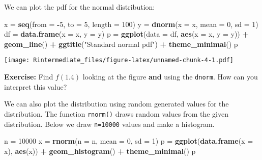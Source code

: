 \documentclass[]{article}
\newenvironment{Shaded}{\begin{snugshade}}{\end{snugshade}}
\newcommand{\KeywordTok}[1]{\textcolor[rgb]{0.13,0.29,0.53}{\textbf{#1}}}
\newcommand{\DataTypeTok}[1]{\textcolor[rgb]{0.13,0.29,0.53}{#1}}
\newcommand{\DecValTok}[1]{\textcolor[rgb]{0.00,0.00,0.81}{#1}}
\newcommand{\StringTok}[1]{\textcolor[rgb]{0.31,0.60,0.02}{#1}}
\newcommand{\OperatorTok}[1]{\textcolor[rgb]{0.81,0.36,0.00}{\textbf{#1}}}
\newcommand{\NormalTok}[1]{#1}
\begin{document}
We can plot the pdf for the normal distribution:

\begin{Shaded}
\begin{Highlighting}[]
\NormalTok{x =}\StringTok{ }\KeywordTok{seq}\NormalTok{(}\DataTypeTok{from =} \OperatorTok{-}\DecValTok{5}\NormalTok{, }\DataTypeTok{to =} \DecValTok{5}\NormalTok{, }\DataTypeTok{length =} \DecValTok{100}\NormalTok{)}
\NormalTok{y =}\StringTok{ }\KeywordTok{dnorm}\NormalTok{(}\DataTypeTok{x =}\NormalTok{ x, }\DataTypeTok{mean =} \DecValTok{0}\NormalTok{, }\DataTypeTok{sd =} \DecValTok{1}\NormalTok{)}
\NormalTok{df =}\StringTok{ }\KeywordTok{data.frame}\NormalTok{(}\DataTypeTok{x =}\NormalTok{ x, }\DataTypeTok{y =}\NormalTok{ y)}
\NormalTok{p =}\StringTok{ }\KeywordTok{ggplot}\NormalTok{(}\DataTypeTok{data =}\NormalTok{ df, }\KeywordTok{aes}\NormalTok{(}\DataTypeTok{x =}\NormalTok{ x, }\DataTypeTok{y =}\NormalTok{ y)) }\OperatorTok{+}\StringTok{ }\KeywordTok{geom_line}\NormalTok{() }\OperatorTok{+}\StringTok{ }\KeywordTok{ggtitle}\NormalTok{(}\StringTok{"Standard normal pdf"}\NormalTok{) }\OperatorTok{+}\StringTok{ }
\StringTok{    }\KeywordTok{theme_minimal}\NormalTok{()}
\NormalTok{p}
\end{Highlighting}
\end{Shaded}

\texttt{[image: Rintermediate\_files/figure-latex/unnamed-chunk-4-1.pdf]}

\textbf{Exercise:} Find \(f(1.4)\) looking at the figure \textbf{and}
using the \texttt{dnorm}. How can you interpret this value?

\begingroup\color{dg}

\endgroup

We can also plot the distribution using random generated values for the
distribution. The function \texttt{rnorm()} draws random values from the
given distribution. Below we draw \texttt{n=10000} values and make a
histogram.

\begin{Shaded}
\begin{Highlighting}[]
\NormalTok{n =}\StringTok{ }\DecValTok{10000}
\NormalTok{x =}\StringTok{ }\KeywordTok{rnorm}\NormalTok{(}\DataTypeTok{n =}\NormalTok{ n, }\DataTypeTok{mean =} \DecValTok{0}\NormalTok{, }\DataTypeTok{sd =} \DecValTok{1}\NormalTok{)}
\NormalTok{p =}\StringTok{ }\KeywordTok{ggplot}\NormalTok{(}\KeywordTok{data.frame}\NormalTok{(}\DataTypeTok{x =}\NormalTok{ x), }\KeywordTok{aes}\NormalTok{(x)) }\OperatorTok{+}\StringTok{ }\KeywordTok{geom_histogram}\NormalTok{() }\OperatorTok{+}\StringTok{ }\KeywordTok{theme_minimal}\NormalTok{()}
\NormalTok{p}
\end{Highlighting}
\end{Shaded}
\end{document}
